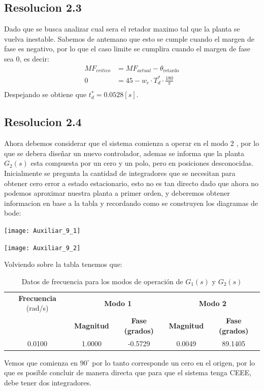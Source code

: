 \documentclass[
  11pt,
  letterpaper,
   addpoints,
   answers
  ]{exam}
\begin{document}
\begin{questions}
\begin{solution}
\subsection*{Resolucion 2.3}
Dado que se busca analizar cual sera el retador maximo tal que la planta se vuelva inestable. Sabemos de antemano que esto se cumple cuando el margen de fase es negativo, por lo que el caso limite se cumplira cuando el margen de fase sea 0, es decir:
\begin{align}
    MF_{critico} &= MF_{actual} - \theta_{\text{retardo}}\\
    0 &= 45  -w_{c} \cdot T_{d}^{*} \cdot \frac{180}{\pi} \\
\end{align}
Despejando se obtiene que $t_{d}^{*}=  0.0528 [s]$.
\subsection*{Resolucion 2.4}
Ahora debemos considerar que el sistema comienza a operar en el modo 2 , por lo que se debera diseñar un nuevo controlador, ademas se informa que la planta $G_{2}(s)$ esta compuesta por un cero y un polo, pero en posiciones desconocidas. Inicialmente se pregunta la cantidad de integradores que se necesitan para obtener cero error a estado estacionario, esto no es tan directo dado que ahora no podemos aproximar nuestra planta a primer orden, y deberemos obtener informacion en base a la tabla y recordando como se construyen los diagramas de bode:
\begin{center}
    \texttt{[image: Auxiliar\_9\_1]}
\end{center}
\begin{center}
    \texttt{[image: Auxiliar\_9\_2]}
\end{center}
Volviendo sobre la tabla tenemos que:
\begin{table}[H]
    \centering
    \footnotesize
    \begin{tabular}{|c|c|c|c|c|}
    \hline
    \textbf{Frecuencia} (rad/s) & \multicolumn{2}{c|}{\textbf{Modo 1}} & \multicolumn{2}{c|}{\textbf{Modo 2}} \\
    \cline{2-5}
    & \textbf{Magnitud} & \textbf{Fase (grados)} & \textbf{Magnitud} & \textbf{Fase (grados)} \\
    \hline
    0.0100 & 1.0000 & -0.5729 & 0.0049 & 89.1405 \\
    \hline
    \end{tabular}
    \caption{Datos de frecuencia para los modos de operación de $G_1(s)$ y $G_2(s)$}
\end{table}
Vemos que comienza en $90^{\circ}$ por lo tanto corresponde un cero en el origen, por lo que es posible concluir de manera directa que para que el sistema tenga CEEE, debe tener dos integradores. 
\end{solution}
\end{questions}
\newpage
\end{document}
